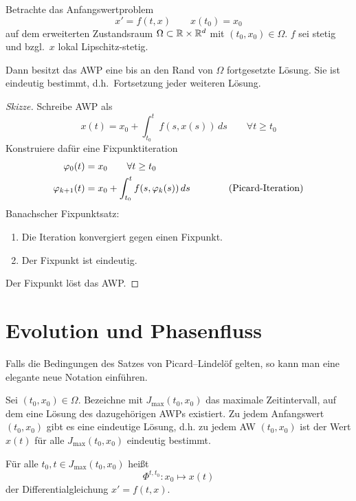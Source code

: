 \begin{satz}
 Betrachte das Anfangswertproblem
 \begin{equation*}
  x' = f(t,x) \qquad x(t_0) = x_0
 \end{equation*}
 auf dem erweiterten Zustandsraum $\Omega \subset \mathbb R \times \mathbb R^d$ mit $(t_0, x_0) \in \Omega$.
 $f$ sei stetig und bzgl.\ $x$ lokal Lipschitz-stetig.

 Dann besitzt das AWP eine bis an den Rand von $\Omega$ fortgesetzte Lösung. Sie ist eindeutig bestimmt, d.h.\ Fortsetzung jeder weiteren Lösung.
\end{satz}
\begin{proof}[Skizze]
	Schreibe AWP als
	\begin{equation*}
		x(t)=x_0+\int_{t_0}^t f(s,x(s))\,ds
		\qquad
		\forall t \geq t_0
	\end{equation*}
	Konstruiere dafür eine Fixpunktiteration
	\begin{align*}
		\varphi_0 (t) & =x_0 \qquad \forall t \geq t_0 \\
		\varphi_{k+1} (t) & =x_0+\int_{t_0}^t f(s,\varphi_k(s))\,ds
		\qquad
		\tag{\text{Picard-Iteration}}
	\end{align*}
	Banachscher Fixpunktsatz: 
	\begin{enumerate}[nolistsep]
			\item Die Iteration konvergiert gegen einen Fixpunkt.
			\item Der Fixpunkt ist eindeutig.
		\end{enumerate}
	Der Fixpunkt löst das AWP.
\end{proof}


\section{Evolution und Phasenfluss}

Falls die Bedingungen des Satzes von Picard--Lindelöf gelten, so kann man eine elegante neue Notation einführen.

Sei $(t_0,x_0) \in \Omega$. Bezeichne mit $J_{\max} (t_0,x_0)$ das maximale Zeitintervall, auf dem eine Lösung des dazugehörigen AWPs existiert.
Zu jedem Anfangswert $(t_0,x_0 )$ gibt es eine eindeutige Lösung, d.h. zu jedem AW $(t_0,x_0 )$ ist der Wert $x(t)$ für alle $J_{\max} (t_0,x_0 )$ eindeutig bestimmt.

\begin{defi}
	Für alle $t_0,t \in J_{\max} (t_0,x_0 )$ heißt
	\begin{equation*}
		\Phi^{t,t_0} \colon x_0 \mapsto x(t)
	\end{equation*}
	 der Differentialgleichung $x' = f(t,x)$.
\end{defi}

